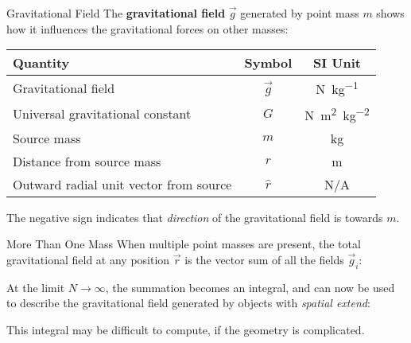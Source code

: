 \documentclass[12pt,compress,aspectratio=169]{beamer}
\begin{document}
\begin{frame}{Gravitational Field}
  The \textbf{gravitational field} $\vec g$ generated by point mass $m$
  shows how it influences the gravitational forces on other masses:

  \begin{center}
    \begin{tabular}{l|c|c}
      \rowcolor{pink}
      \textbf{Quantity} & \textbf{Symbol} & \textbf{SI Unit} \\ \hline
      Gravitational field       & $\vec g$ & \si{\newton\per\kilo\gram}\\
      Universal gravitational constant
      & $G$ & \si{\newton\metre\squared\per\kilo\gram\squared} \\
      Source mass               & $m$ & \si{\kilo\gram} \\
      Distance from source mass & $r$ & \si\metre \\
      Outward radial unit vector from source & $\hat r$ & N/A
    \end{tabular}
  \end{center}
  The negative sign indicates that \emph{direction} of the gravitational field
  is towards $m$.
\end{frame}



\begin{frame}{More Than One Mass}
  When multiple point masses are present, the total gravitational field at any
  position $\vec r$ is the vector sum of all the fields $\vec g_i$:
    

  At the limit $N\rightarrow\infty$, the summation becomes an integral, and can
  now be used to describe the gravitational field generated by objects with
  \emph{spatial extend}:

  
  This integral may be difficult to compute, if the geometry is complicated.
\end{frame}
\end{document}
